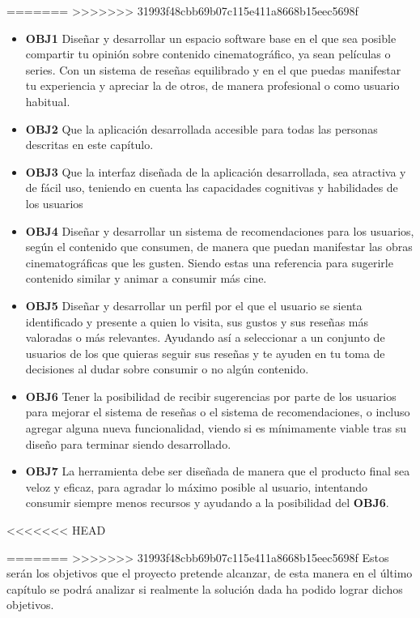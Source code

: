 =======
>>>>>>> 31993f48cbb69b07c115e411a8668b15eec5698f
\begin{itemize}
    \item \textbf{OBJ1} Diseñar y desarrollar un espacio software base en el que sea posible 
    compartir tu opinión sobre contenido cinematográfico, ya sean películas o series. Con un 
    sistema de reseñas equilibrado y en el que puedas manifestar tu experiencia y apreciar la de otros, 
    de manera profesional o como usuario habitual.
    \item \textbf{OBJ2} Que la aplicación desarrollada accesible para todas las personas descritas en 
    este capítulo.
    \item \textbf{OBJ3} Que la interfaz diseñada de la aplicación desarrollada, sea atractiva y de 
    fácil uso, teniendo en cuenta las capacidades cognitivas y habilidades de los usuarios
    \item \textbf{OBJ4} Diseñar y desarrollar un sistema de recomendaciones para los usuarios, según el 
    contenido que consumen, de manera que puedan manifestar las obras cinematográficas que les gusten. 
    Siendo estas una referencia para sugerirle contenido similar y animar a consumir más cine.
    \item \textbf{OBJ5} Diseñar y desarrollar un perfil por el que el usuario se sienta identificado y 
    presente a quien lo visita, sus gustos y sus reseñas más valoradas o más relevantes. Ayudando así a
    seleccionar a un conjunto de usuarios de los que quieras seguir sus reseñas y te ayuden en tu toma 
    de decisiones al dudar sobre consumir o no algún contenido.
    \item \textbf{OBJ6} Tener la posibilidad de recibir sugerencias por parte de los usuarios para 
    mejorar el sistema de reseñas o el sistema de recomendaciones, o incluso agregar alguna nueva 
    funcionalidad, viendo si es mínimamente viable tras su diseño para terminar siendo desarrollado.
    \item \textbf{OBJ7} La herramienta debe ser diseñada de manera que el producto final sea veloz y 
    eficaz, para agradar lo máximo posible al usuario, intentando consumir siempre menos recursos y 
    ayudando a la posibilidad del \textbf{OBJ6}.
\end{itemize}
<<<<<<< HEAD

=======
>>>>>>> 31993f48cbb69b07c115e411a8668b15eec5698f
Estos serán los objetivos que el proyecto pretende alcanzar, de esta manera en el último capítulo se 
podrá analizar si realmente la solución dada ha podido lograr dichos objetivos.